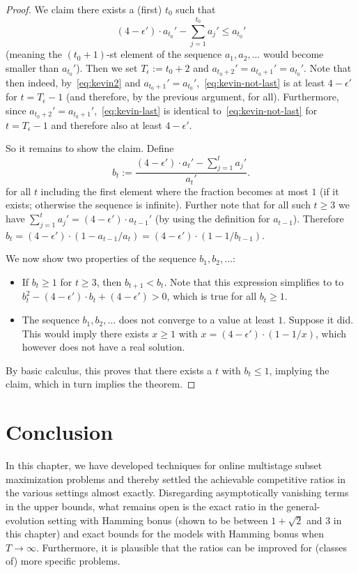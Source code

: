 \documentclass[a4paper]{book}
\newtheorem{proof}{\noindent{\bf Proof.} }
\begin{document}
\begin{proof}
We claim there exists a (first) $t_0$ such that \begin{equation}\label{eq:kevin2}
    (4-\epsilon')\cdot a_{t_0}'-\sum_{j=1}^{t_0} a_j'\leq a_{t_0}'
\end{equation} (meaning the $(t_0+1)$-st element of the sequence $a_1,a_2,\dots$ would become smaller than $a_{t_0}'$). Then we set $T_\epsilon:=t_0+2$ and $a_{t_0+2}'=a_{t_0+1}'=a_{t_0}'$. Note that then indeed, by~\eqref{eq:kevin2} and $a_{t_0+1}'=a_{t_0}'$,~\eqref{eq:kevin-not-last} is at least $4-\epsilon'$ for $t=T_\epsilon-1$ (and therefore, by the previous argument, for all). Furthermore, since $a_{t_0+2}'=a_{t_0+1}'$,~\eqref{eq:kevin-last} is identical to~\eqref{eq:kevin-not-last} for $t=T_\epsilon-1$ and therefore also at least $4-\epsilon'$.

So it remains to show the claim. Define $$b_{t}:=\frac{(4-\epsilon')\cdot a_{t}'-\sum_{j=1}^{t} a_j'}{a_{t}'}.$$ for all $t$ including the first element where the fraction becomes at most $1$ (if it exists; otherwise the sequence is infinite). Further note that for all such $t\geq 3$ we have $\sum_{j=1}^t a_j'=(4-\epsilon')\cdot a_{t-1}'$ (by using the definition for $a_{t-1}$). Therefore $b_{t}=(4-\epsilon')\cdot(1-a_{t-1}/a_t)=(4-\epsilon')\cdot(1-1/b_{t-1})$.

We now show two properties of the sequence $b_1,b_2,\dots$:
\begin{itemize}
    \item If $b_t\geq 1$ for $t\geq 3$, then $b_{t+1}<b_t$. Note that this expression simplifies to to $b_t^2-(4-\epsilon')\cdot b_t+(4-\epsilon')>0$, which is true for all $b_t\geq 1$.
    \item The sequence $b_1,b_2,\dots$ does not converge to a value at least $1$. Suppose it did. This would imply there exists $x\geq 1$ with $x=(4-\epsilon')\cdot(1-1/x)$, which however does not have a real solution.
\end{itemize}
By basic calculus, this proves that there exists a $t$ with $b_t\leq 1$, implying the claim, which in turn implies the theorem. %
\end{proof}

\section{Conclusion}\label{sec:conclusion}

In this chapter, we have developed techniques for online multistage subset maximization problems and thereby settled the achievable competitive ratios in the various settings almost exactly. Disregarding asymptotically vanishing terms in the upper bounds, what remains open is the exact ratio in the general-evolution setting with Hamming bonus (shown to be between $1+\sqrt{2}$ and $3$ in this chapter) and exact bounds for the models with Hamming bonus when $T\rightarrow\infty$. Furthermore, it is plausible that the ratios can be improved for (classes of) more specific problems.
\end{document}
